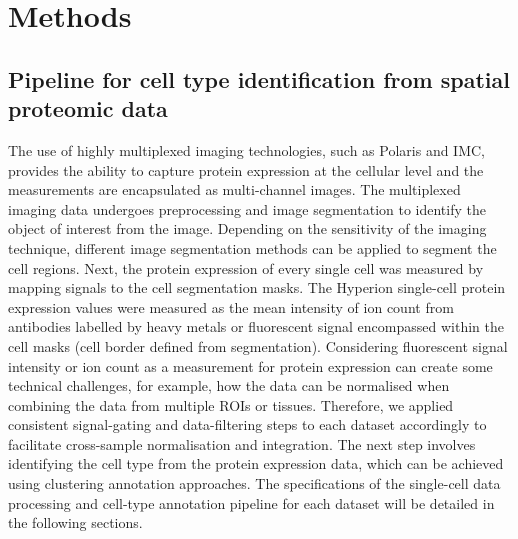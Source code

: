 \section{Methods}
\subsection{Pipeline for cell type identification from spatial proteomic data}
\label{Sec:3.2_SP_celltype_id_pipeline}	%
The use of highly multiplexed imaging technologies, such as Polaris and IMC, provides the ability to capture protein expression at the cellular level and the measurements are encapsulated as multi-channel images. The multiplexed imaging data undergoes preprocessing and image segmentation to identify the object of interest from the image. Depending on the sensitivity of the imaging technique, different image segmentation methods can be applied to segment the cell regions. Next, the protein expression of every single cell was measured by mapping signals to the cell segmentation masks. The Hyperion single-cell protein expression values were measured as the mean intensity of ion count from antibodies labelled by heavy metals or fluorescent signal encompassed within the cell masks (\ie cell border defined from segmentation). Considering fluorescent signal intensity or ion count as a measurement for protein expression can create some technical challenges, for example, how the data can be normalised when combining the data from multiple ROIs or tissues. Therefore, we applied consistent signal-gating and data-filtering steps to each dataset accordingly to facilitate cross-sample normalisation and integration. The next step involves identifying the cell type from the protein expression data, which can be achieved using clustering annotation approaches. The specifications of the single-cell data processing and cell-type annotation pipeline for each dataset will be detailed in the following sections.  

